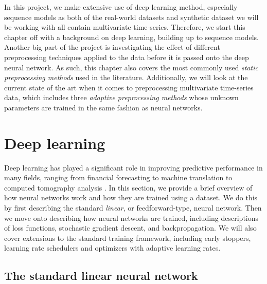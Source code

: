 \documentclass{statsmsc}
\begin{document}
{%

In this project, we make extensive use of deep learning method, especially sequence models as
both of the real-world datasets and synthetic dataset we will be working with all contain
multivariate time-series.  Therefore, we start this chapter off with a background on deep
learning, building up to sequence models.
Another big part of the project is investigating the effect of different
preprocessing techniques applied to the data before it is passed onto the deep neural network.
As such, this chapter also covers the most commonly used \textit{static preprocessing methods} used
in the literature. Additionally, we will look at the current state of the art when it comes
to preprocessing multivariate time-series data, which includes three
\textit{adaptive preprocessing methods} whose unknown parameters are trained in the same
fashion as neural networks.


\section{Deep learning}%
\label{sec:Deep learning}

Deep learning has played a significant role in improving predictive performance in many fields,
ranging from financial forecasting \citep{dain,rdain,bin} to machine
translation \citep{gru_cho,attention} to computed tomography analysis
\citep{mixture_ct}. In this section, we provide a brief overview of how neural networks work and
how they are trained using a dataset. We do this by first describing the standard \textit{linear},
or feedforward-type, neural network. Then we move onto describing how neural networks are trained,
including descriptions of loss functions, stochastic gradient descent, and backpropagation. We will
also cover extensions to the standard training framework, including early stoppers, learning
rate schedulers and optimizers with adaptive learning rates.

\subsection{The standard linear neural network}%
\label{sub:The standard linear neural network}

}
\end{document}
